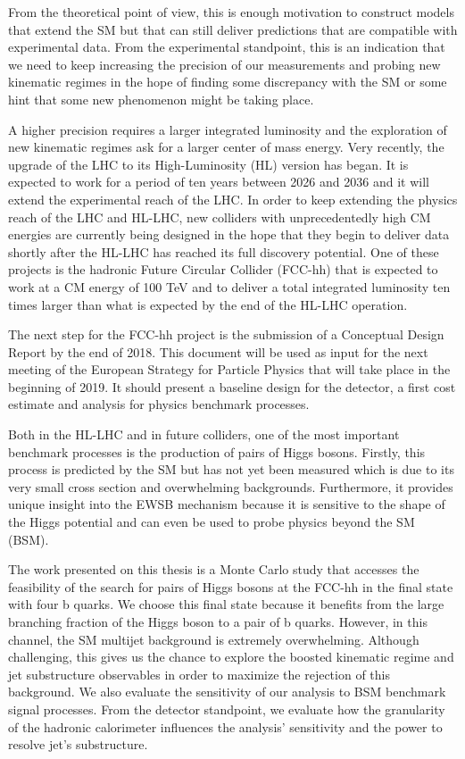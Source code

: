 From the theoretical point of view, this is enough motivation to construct models that extend the SM but that can still deliver predictions that are compatible with experimental data. From the experimental standpoint, this is an indication that we need to keep increasing the precision of our measurements and probing new kinematic regimes in the hope of finding some discrepancy with the SM or some hint that some new phenomenon might be taking place.

A higher precision requires a larger integrated luminosity and the exploration of new kinematic regimes ask for a larger center of mass energy. Very recently, the upgrade of the LHC to its High-Luminosity (HL) version has began. It is expected to work for a period of ten years between 2026 and 2036 and it will extend the experimental reach of the LHC. In order to keep extending the physics reach of the LHC and HL-LHC, new colliders with unprecedentedly high CM energies are currently being designed in the hope that they begin to deliver data shortly after the HL-LHC has reached its full discovery potential. One of these projects is the hadronic Future Circular Collider (FCC-hh) that is expected to work at a CM energy of 100 TeV and to deliver a total integrated luminosity ten times larger than what is expected by the end of the HL-LHC operation. 

The next step for the FCC-hh project is the submission of a Conceptual Design Report by the end of 2018. This document will be used as input for the next meeting of the European Strategy for Particle Physics that will take place in the beginning of 2019. It should present a baseline design for the detector, a first cost estimate and analysis for physics benchmark processes.

Both in the HL-LHC and in future colliders, one of the most important benchmark processes is the production of pairs of Higgs bosons. Firstly, this process is predicted by the SM but has not yet been measured which is due to its very small cross section and overwhelming backgrounds. Furthermore, it provides unique insight into the EWSB mechanism because it is sensitive to the shape of the Higgs potential and can even be used to probe physics beyond the SM (BSM).

The work presented on this thesis is a Monte Carlo study that accesses the feasibility of the search for pairs of Higgs bosons at the FCC-hh in the final state with four b quarks. We choose this final state because it benefits from the large branching fraction of the Higgs boson to a pair of b quarks. However, in this channel, the SM multijet background is extremely overwhelming. Although challenging, this gives us the chance to explore the boosted kinematic regime and jet substructure observables in order to maximize the rejection of this background. We also evaluate the sensitivity of our analysis to BSM benchmark signal processes. From the detector standpoint, we evaluate how the granularity of the hadronic calorimeter influences the analysis' sensitivity and the power to resolve jet's substructure.

